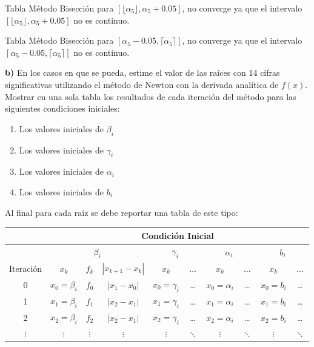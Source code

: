 \documentclass{article} %
\begin{document}
Tabla Método Bisección para $[\lfloor \alpha_5 \rfloor, \alpha_5 +0.05]$, no converge ya que el intervalo $[\lfloor \alpha_5 \rfloor, \alpha_5 +0.05]$ no es continuo.

Tabla Método Bisección para $[\alpha_5 - 0.05,\lceil \alpha_5 \rceil]$, no converge ya que el intervalo $[\alpha_5 - 0.05,\lceil \alpha_5 \rceil]$ no es continuo.

\textbf{b)} En los casos en que se pueda, estime el valor de las raíces con 14 cifras significativas utilizando el método de Newton con la derivada analítica de $f(x)$. Mostrar en una sola tabla los resultados de cada iteración del método para las siguientes condiciones iniciales:

\begin{enumerate}[i]
    \item Los valores iniciales de $\beta_i$
    \item Los valores iniciales de $\gamma_i$
    \item Los valores iniciales de $\alpha_i$
    \item Los valores iniciales de $b_i$
\end{enumerate}

Al final para cada raíz se debe reportar una tabla de este tipo:

\begin{table}[H]
    \centering
    \begin{tabular}{|c|c|c|c|c|c|c|c|c|c|}
\hline
     &  \multicolumn{9}{|c|}{Condición Inicial}\\
     \hline
     & \multicolumn{3}{|c|}{$\beta_i$} & \multicolumn{2}{|c|}{$\gamma_i$} & \multicolumn{2}{|c|}{$\alpha_i$} & \multicolumn{2}{|c|}{$b_i$}\\
     \hline
     Iteración & $x_k$ & $f_k$ & $|x_{k+1}-x_k|$ & $x_k$ & $\ldots$ & $x_k$ & $\ldots$ & $x_k$ & $\ldots$ \\
     \hline
     0&$x_0=\beta_i$&$f_0$&$|x_1 - x_0|$&$x_0=\gamma_i$&\ldots&$x_0=\alpha_i$&\ldots&$x_0=b_i$&\ldots\\
     \hline
     1&$x_1=\beta_i$&$f_1$&$|x_2 - x_1|$&$x_1=\gamma_i$&\ldots&$x_1=\alpha_i$&\ldots&$x_1=b_i$&\ldots\\
     \hline
     2&$x_2=\beta_i$&$f_2$&$|x_2 - x_1|$&$x_2=\gamma_i$&\ldots&$x_2=\alpha_i$&\ldots&$x_2=b_i$&\ldots\\
     \hline
     $\vdots$ & $\vdots$ & $\vdots$ & $\vdots$ & $\vdots$ & $\ddots$ &$ \vdots$ &$ \ddots$ & $\vdots$ & $\ddots$ \\
     \hline
\end{tabular}
\end{table}
\end{document}
